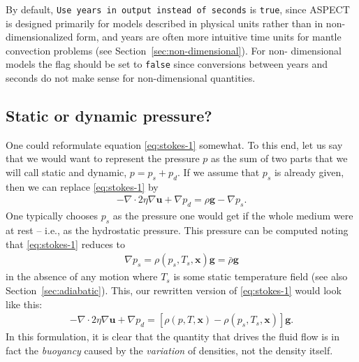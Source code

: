 \documentclass{article}
\newcommand{\aspect}{\textsc{ASPECT}}
\begin{document}
By default, \texttt{Use years in output instead of seconds} is \texttt{true}, 
since \aspect{} is designed primarily for models described in physical units rather 
than in non-dimensionalized form, and years are often more intuitive time units 
for mantle convection problems (see Section~\ref{sec:non-dimensional}). For non-
dimensional models the flag should be set to \texttt{false} since conversions 
between years and seconds do not make sense for non-dimensional quantities. 

\subsection{Static or dynamic pressure?}
\label{sec:pressure-static-dyn}

One could reformulate equation \eqref{eq:stokes-1} somewhat. To this end, let us
say that we would want to represent the pressure $p$ as the sum of two parts
that we will call static and dynamic, $p=p_s+p_d$. If we assume that $p_s$ is
already given, then we can replace \eqref{eq:stokes-1} by
\begin{gather*}
  -\nabla \cdot 2\eta
  \nabla \mathbf u + \nabla p_d =
  \rho\mathbf g - \nabla p_s.
\end{gather*}
One typically chooses $p_s$ as the pressure one would get if the whole medium
were at rest -- i.e., as the hydrostatic pressure. This pressure can be
computed noting that \eqref{eq:stokes-1} reduces to
\begin{gather*}
  \nabla p_s = \rho(p_s,T_s,\mathbf x)\mathbf g = \bar\rho \mathbf g
\end{gather*}
in the absence of any motion where $T_s$ is some static temperature field (see
also Section~\ref{sec:adiabatic}). This, our rewritten version of
\eqref{eq:stokes-1} would look like this:
\begin{gather*}
  -\nabla \cdot 2\eta
  \nabla \mathbf u + \nabla p_d =
  \left[\rho(p,T,\mathbf x)-\rho(p_s,T_s,\mathbf x)\right]\mathbf g.
\end{gather*}
In this
formulation, it is clear that the quantity that drives the fluid flow is in
fact the \textit{buoyancy} caused by the \textit{variation} of densities,
not the density itself.
\end{document}
